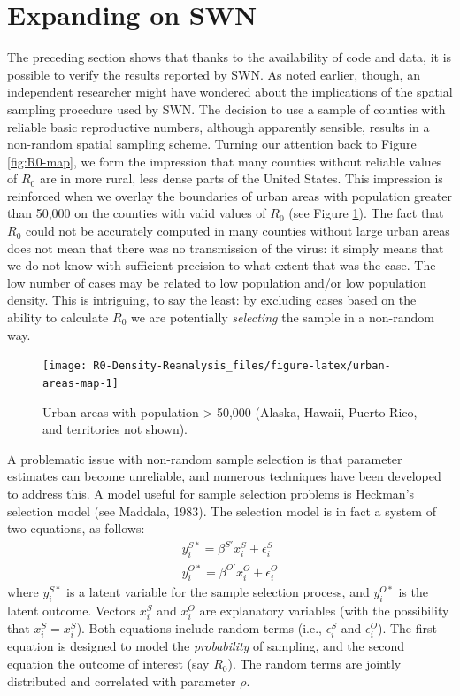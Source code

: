 \documentclass[]{elsarticle} %
\begin{document}
\hypertarget{expanding-on-swn}{%
\section{Expanding on SWN}\label{expanding-on-swn}}

The preceding section shows that thanks to the availability of code and
data, it is possible to verify the results reported by SWN. As noted
earlier, though, an independent researcher might have wondered about the
implications of the spatial sampling procedure used by SWN. The decision
to use a sample of counties with reliable basic reproductive numbers,
although apparently sensible, results in a non-random spatial sampling
scheme. Turning our attention back to Figure \ref{fig:R0-map}, we form
the impression that many counties without reliable values of \(R_0\) are
in more rural, less dense parts of the United States. This impression is
reinforced when we overlay the boundaries of urban areas with population
greater than 50,000 on the counties with valid values of \(R_0\) (see
Figure \ref{fig:urban-areas-map}). The fact that \(R_0\) could not be
accurately computed in many counties without large urban areas does not
mean that there was no transmission of the virus: it simply means that
we do not know with sufficient precision to what extent that was the
case. The low number of cases may be related to low population and/or
low population density. This is intriguing, to say the least: by
excluding cases based on the ability to calculate \(R_0\) we are
potentially \emph{selecting} the sample in a non-random way.

\begin{figure}
\texttt{[image: R0-Density-Reanalysis\_files/figure-latex/urban-areas-map-1]} \caption{\label{fig:urban-areas-map}Urban areas with population > 50,000 (Alaska, Hawaii, Puerto Rico, and territories not shown).}\label{fig:urban-areas-map}
\end{figure}

A problematic issue with non-random sample selection is that parameter
estimates can become unreliable, and numerous techniques have been
developed to address this. A model useful for sample selection problems
is Heckman's selection model (see Maddala, 1983). The selection model is
in fact a system of two equations, as follows: \[
\begin{array}{c}
y_i^{S*} = \beta^{S\prime}x_i^S+\epsilon_i^S\\
y_i^{O*} = \beta^{O\prime}x_i^O+\epsilon_i^O
\end{array}
\] \noindent where \(y_i^{S*}\) is a latent variable for the sample
selection process, and \(y_i^{O*}\) is the latent outcome. Vectors
\(x_i^S\) and \(x_i^O\) are explanatory variables (with the possibility
that \(x_i^S = x_i^S\)). Both equations include random terms (i.e.,
\(\epsilon_i^S\) and \(\epsilon_i^O\)). The first equation is designed
to model the \emph{probability} of sampling, and the second equation the
outcome of interest (say \(R_0\)). The random terms are jointly
distributed and correlated with parameter \(\rho\).
\end{document}

